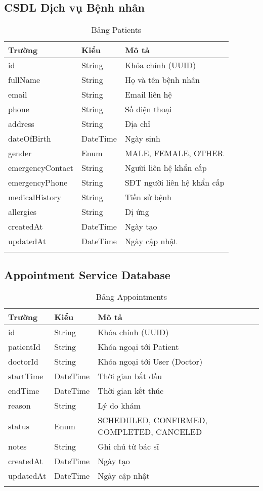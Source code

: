 \documentclass[12pt,a4paper]{report}
\begin{document}
    \subsection{CSDL Dịch vụ Bệnh nhân}
    \begin{longtable}{|p{3cm}|p{2cm}|p{8cm}|}
    \hline
    \textbf{Trường} & \textbf{Kiểu} & \textbf{Mô tả} \\
    \hline
    id & String & Khóa chính (UUID) \\
    \hline
    fullName & String & Họ và tên bệnh nhân \\
    \hline
    email & String & Email liên hệ \\
    \hline
    phone & String & Số điện thoại \\
    \hline
    address & String & Địa chỉ \\
    \hline
    dateOfBirth & DateTime & Ngày sinh \\
    \hline
    gender & Enum & MALE, FEMALE, OTHER \\
    \hline
    emergencyContact & String & Người liên hệ khẩn cấp \\
    \hline
    emergencyPhone & String & SĐT người liên hệ khẩn cấp \\
    \hline
    medicalHistory & String & Tiền sử bệnh \\
    \hline
    allergies & String & Dị ứng \\
    \hline
    createdAt & DateTime & Ngày tạo \\
    \hline
    updatedAt & DateTime & Ngày cập nhật \\
    \hline
    \caption{Bảng Patients}
    \end{longtable}

    \subsection{Appointment Service Database}
    \begin{longtable}{|p{3cm}|p{2cm}|p{8cm}|}
    \hline
    \textbf{Trường} & \textbf{Kiểu} & \textbf{Mô tả} \\
    \hline
    id & String & Khóa chính (UUID) \\
    \hline
    patientId & String & Khóa ngoại tới Patient \\
    \hline
    doctorId & String & Khóa ngoại tới User (Doctor) \\
    \hline
    startTime & DateTime & Thời gian bắt đầu \\
    \hline
    endTime & DateTime & Thời gian kết thúc \\
    \hline
    reason & String & Lý do khám \\
    \hline
    status & Enum & SCHEDULED, CONFIRMED, COMPLETED, CANCELED \\
    \hline
    notes & String & Ghi chú từ bác sĩ \\
    \hline
    createdAt & DateTime & Ngày tạo \\
    \hline
    updatedAt & DateTime & Ngày cập nhật \\
    \hline
    \caption{Bảng Appointments}
    \end{longtable}
\end{document}

